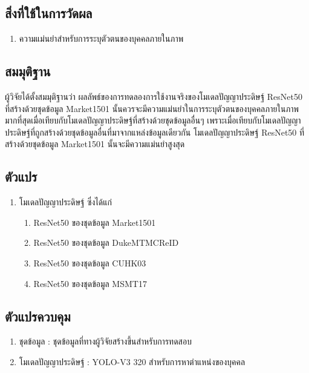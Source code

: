 \subsection*{สิ่งที่ใช้ในการวัดผล}
	\begin{enumerate}
		\setlength\itemsep{-0.25em}
		\item ความแม่นยำสำหรับการระบุตัวตนของบุคคลภายในภาพ
	\end{enumerate}
\subsection*{สมมุติฐาน}
ผู้วิจัยได้ตั้งสมมุติฐานว่า ผลลัพธ์ของการทดลองการใช้งานจริงของโมเดลปัญญาประดิษฐ์ ResNet50 ที่สร้างด้วยชุดข้อมูล Market1501 
นั้นควรจะมีความแม่นยำในการระบุตัวตนของบุคคลภายในภาพมากที่สุดเมื่อเทียบกับโมเดลปัญญาประดิษฐ์ที่สร้างด้วยชุดข้อมูลอื่นๆ
เพราะเมื่อเทียบกับโมเดลปัญญาประดิษฐ์ที่ถูกสร้างด้วยชุดข้อมูลอื่นที่มาจากแหล่งข้อมูลเดียวกัน โมเดลปัญญาประดิษฐ์ ResNet50 ที่สร้างด้วยชุดข้อมูล Market1501 นั้นจะมีความแม่นยำสูงสุด
\subsection*{ตัวแปร}
	\begin{enumerate}
		\setlength\itemsep{-0.25em}
		\item โมเดลปัญญาประดิษฐ์ ซึ่งได้แก่
		\begin{enumerate}
			\setlength\itemsep{-0.25em}
			\item ResNet50 ของชุดข้อมูล Market1501
			\item ResNet50 ของชุดข้อมูล DukeMTMCReID
			\item ResNet50 ของชุดข้อมูล CUHK03	
			\item ResNet50 ของชุดข้อมูล MSMT17
		\end{enumerate}
	\end{enumerate}
\subsection*{ตัวแปรควบคุม}
	\begin{enumerate}
		\setlength\itemsep{-0.25em}
		\item ชุดข้อมูล : ชุดข้อมูลที่ทางผู้วิจัยสร้างขึ้นสำหรับการทดสอบ
		\item โมเดลปัญญาประดิษฐ์ : YOLO-V3 320  สำหรับการหาตำแหน่งของบุคคล
	\end{enumerate}
